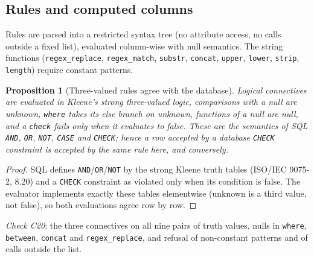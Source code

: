 \documentclass[11pt,a4paper]{article}
\newtheorem{proposition}{Proposition}
\theoremstyle{definition}
\theoremstyle{remark}
\begin{document}
\subsection{Rules and computed columns}
Rules are parsed into a restricted syntax tree (no attribute access, no calls outside a fixed list), evaluated column-wise with null semantics. The string functions (\texttt{regex\_replace}, \texttt{regex\_match}, \texttt{substr}, \texttt{concat}, \texttt{upper}, \texttt{lower}, \texttt{strip}, \texttt{length}) require constant patterns.

\begin{proposition}[Three-valued rules agree with the database]\label{prop:k3}
Logical connectives are evaluated in Kleene's strong three-valued logic, comparisons with a null are unknown, \texttt{where} takes its else branch on unknown, functions of a null are null, and a \texttt{check} fails only when it evaluates to false. These are the semantics of SQL \texttt{AND}, \texttt{OR}, \texttt{NOT}, \texttt{CASE} and \texttt{CHECK}; hence a row accepted by a database \texttt{CHECK} constraint is accepted by the same rule here, and conversely.
\end{proposition}
\begin{proof}
SQL defines \texttt{AND}/\texttt{OR}/\texttt{NOT} by the strong Kleene truth tables (ISO/IEC 9075-2, 8.20) and a \texttt{CHECK} constraint as violated only when its condition is false. The evaluator implements exactly these tables elementwise (unknown is a third value, not false), so both evaluations agree row by row.
\end{proof}
\noindent\emph{Check C20}: the three connectives on all nine pairs of truth values, nulls in \texttt{where}, \texttt{between}, \texttt{concat} and \texttt{regex\_replace}, and refusal of non-constant patterns and of calls outside the list.
\end{document}

